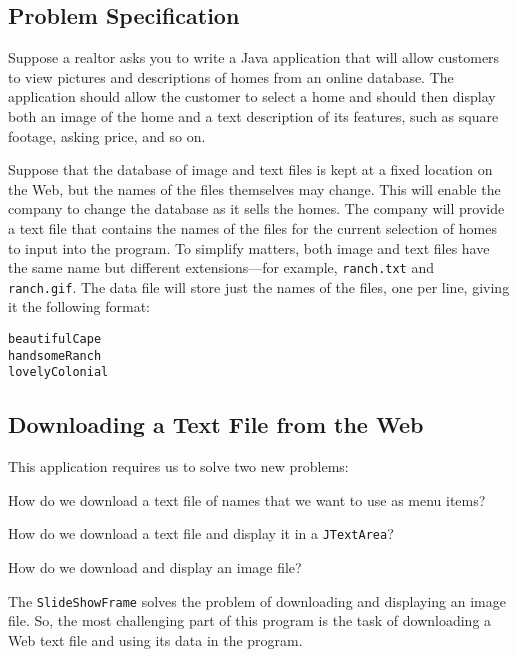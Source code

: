 \subsection*{Problem Specification}
\noindent Suppose a realtor asks you to write a Java application that will
allow customers to view pictures and descriptions of homes from
an online database.   The application should allow the customer to
select a home and should then display both an image of the home and a
text description of its features, such as square footage, asking
price, and so on.

Suppose that the database of image and text files is kept at a fixed
location on the Web, but the names of the files themselves may change.
This will enable the company to change the database as it sells the
homes.  The company will provide a text file that contains the names
of the files for the current selection of homes to input into the
program.  To simplify matters, both image and text files have the same
name but different extensions---for example, {\tt ranch.txt} and {\tt
ranch.gif}.  The data file will store just the names of the files, one
per line, giving it the following format:

\begin{jjjlisting}
\begin{lstlisting}
beautifulCape
handsomeRanch
lovelyColonial
\end{lstlisting}
\end{jjjlisting}

\subsection{Downloading a Text File from the Web}
\noindent This application requires us to solve two new problems:

\begin{NL}
\item  How do we download a text file of names that we want to use as
menu items?
\item  How do we download a text file and display it in a {\tt JTextArea}?
\item  How do we download and display an image file?
\end{NL}

\noindent The {\tt SlideShowFrame} solves the problem of downloading and displaying an image file.   So, the most challenging part of this program is the task of
downloading a Web text file and using its data in the program.

